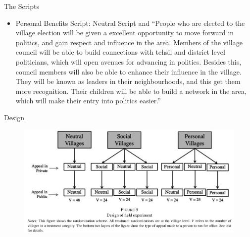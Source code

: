 \documentclass[11pt,notes=hide,aspectratio=169,mathserif]{beamer}
\begin{document}
\begin{frame}{The Scripts}
    \begin{itemize}
    \item Personal Benefits Script: Neutral Script and ``People who are elected to the village election will be given a excellent opportunity to move forward in politics, and gain respect and influence in the area. Members of the village council will be able to build connections with tehsil and district level politicians, which will open avenues for advancing in politics. Besides this, council members will also be able to enhance their influence in the village. They will be known as leaders in their neighbourhoods, and this get them more recognition. Their children will be able to build a network in the area, which will make their entry into politics easier.''
    \end{itemize}
    \end{frame}
\begin{frame}{Design}
\begin{figure}
\centering
\includegraphics[width=1\textwidth]{inputs/fig11.png}
\end{figure}
\end{frame}
\end{document}
